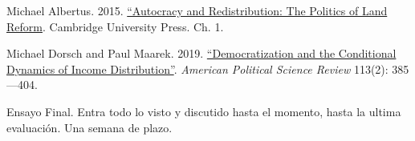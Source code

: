 \documentclass[letterpaper]{article}
\renewenvironment{itemize}{
  \begin{list}{}{
    \setlength{\leftmargin}{1.5em}
  }
}{
  \end{list}
}
\begin{document}
\begin{enumerate}[label=\roman*.]
\begin{itemize}
\begin{itemize}
          \item[$\circ$] Michael Albertus. 2015. \href{https://github.com/hbahamonde/Ciencia_Politica_II/raw/master/Readings/Albertus_2015.pdf}{``Autocracy and Redistribution: The Politics of Land Reform}. Cambridge University Press. Ch. 1.
					
          \item[$\circ$] Michael Dorsch and Paul Maarek. 2019. \href{https://github.com/hbahamonde/Ciencia_Politica_II/raw/master/Readings/Dorsch_2019.pdf}{``Democratization and the Conditional Dynamics of Income Distribution''}. \emph{American Political Science Review} 113(2): 385---404.
				\end{itemize}


		\end{itemize}

\item[{\color{red}\Pointinghand}] Ensayo Final. Entra todo lo visto y discutido hasta el momento, hasta la ultima evaluaci\'on. Una semana de plazo.

\end{enumerate}


	


















\newpage
{}
\setcounter{page}{1}
\printbibliography
\end{document}
